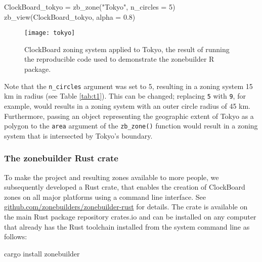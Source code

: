 \documentclass{josis}
\newenvironment{Shaded}{\begin{snugshade}}{\end{snugshade}}
\newcommand{\AttributeTok}[1]{\textcolor[rgb]{0.77,0.63,0.00}{#1}}
\newcommand{\DecValTok}[1]{\textcolor[rgb]{0.00,0.00,0.81}{#1}}
\newcommand{\ExtensionTok}[1]{#1}
\newcommand{\FloatTok}[1]{\textcolor[rgb]{0.00,0.00,0.81}{#1}}
\newcommand{\FunctionTok}[1]{\textcolor[rgb]{0.00,0.00,0.00}{#1}}
\newcommand{\NormalTok}[1]{#1}
\newcommand{\OtherTok}[1]{\textcolor[rgb]{0.56,0.35,0.01}{#1}}
\newcommand{\StringTok}[1]{\textcolor[rgb]{0.31,0.60,0.02}{#1}}
\begin{document}
\begin{Shaded}
\begin{Highlighting}[]
\NormalTok{ClockBoard\_tokyo }\OtherTok{=} \FunctionTok{zb\_zone}\NormalTok{(}\StringTok{"Tokyo"}\NormalTok{, }\AttributeTok{n\_circles =} \DecValTok{5}\NormalTok{)}
\FunctionTok{zb\_view}\NormalTok{(ClockBoard\_tokyo, }\AttributeTok{alpha =} \FloatTok{0.8}\NormalTok{)}
\end{Highlighting}
\end{Shaded}

\begin{figure}

{\centering \texttt{[image: tokyo]} 

}

\caption{ClockBoard zoning system applied to Tokyo, the result of running the reproducible code used to demonstrate the zonebuilder R package.}\label{fig:tokyo}
\end{figure}

Note that the \texttt{n\_circles} argument was set to 5, resulting in a zoning system 15 km in radius (see Table \ref{tab:t1}).
This can be changed; replacing \texttt{5} with \texttt{9}, for example, would results in a zoning system with an outer circle radius of 45 km.
Furthermore, passing an object representing the geographic extent of Tokyo as a polygon to the \texttt{area} argument of the \texttt{zb\_zone()} function would result in a zoning system that is intersected by Tokyo's boundary.

\hypertarget{the-zonebuilder-rust-crate}{%
\subsubsection{The zonebuilder Rust crate}\label{the-zonebuilder-rust-crate}}

To make the project and resulting zones available to more people, we subsequently developed a Rust crate, that enables the creation of ClockBoard zones on all major platforms using a command line interface.
See \href{https://github.com/zonebuilders/zonebuilder-rust}{github.com/zonebuilders/zonebuilder-rust} for details.
The crate is available on the main Rust package repository crates.io and can be installed on any computer that already has the Rust toolchain installed from the system command line as follows:

\begin{Shaded}
\begin{Highlighting}[]
\ExtensionTok{cargo}\NormalTok{ install zonebuilder}
\end{Highlighting}
\end{Shaded}
\end{document}
